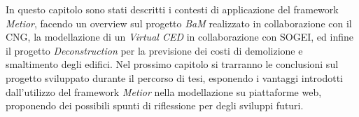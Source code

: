 In questo capitolo sono stati descritti i contesti di applicazione del framework
\emph{Metior}, facendo un overview sul progetto \emph{BaM} realizzato in collaborazione con il CNG,
la modellazione di un \emph{Virtual CED} in collaborazione con
SOGEI, ed infine il progetto \emph{Deconstruction} per la previsione dei costi di demolizione e smaltimento degli edifici.
Nel prossimo capitolo si trarranno le conclusioni sul progetto sviluppato durante il
percorso di tesi, esponendo i vantaggi introdotti dall’utilizzo del framework
\emph{Metior} nella modellazione su piattaforme web, proponendo dei possibili
spunti di riflessione per degli sviluppi futuri.
